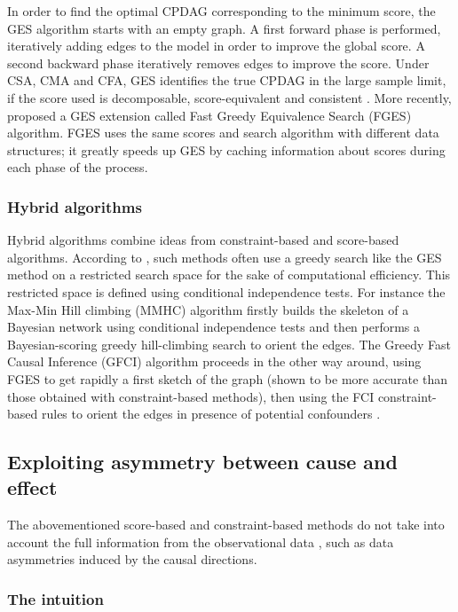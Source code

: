 \documentclass[a4paper, 11pt]{article}
\begin{document}
In order to find the optimal CPDAG corresponding to the minimum score, the GES algorithm starts with an empty graph. A first forward phase is performed, iteratively adding edges to the model in order to improve the global score.  A second backward phase iteratively removes edges to improve the score. Under CSA, CMA and CFA, GES identifies the true CPDAG in the large sample limit, if the score used is decomposable, score-equivalent and consistent \citep{chickering2002optimal}. More recently, \cite{ramsey2015scaling} proposed a GES extension called Fast Greedy Equivalence Search (FGES) algorithm.  FGES uses the same scores and search algorithm with different data structures; it greatly speeds up GES by caching information about scores during each phase of the process.

\subsubsection{Hybrid algorithms} 

Hybrid algorithms combine ideas from constraint-based and score-based algorithms. According to \cite{nandy2015high}, such methods often use a greedy search like the GES method on a restricted search space for the sake of computational efficiency. This  restricted space is defined using conditional independence tests.   For instance the Max-Min Hill climbing (MMHC) algorithm \citep{tsamardinos2006max} firstly builds the skeleton of a Bayesian network using conditional independence tests and then performs a Bayesian-scoring greedy hill-climbing search to orient the edges. 
The Greedy Fast Causal Inference (GFCI) algorithm proceeds in the other way around, using FGES to get rapidly a first sketch of the graph (shown to be more accurate than those obtained with constraint-based methods), then using the FCI constraint-based rules to orient the edges in presence of potential confounders \citep{ogarrio2016hybrid}.

\subsection{Exploiting asymmetry between cause and effect}

The abovementioned score-based and constraint-based methods do not take into account the full information from the observational data \citep{spirtes2016causal}, such as data asymmetries induced by the causal directions.

\subsubsection{The intuition} 
\end{document}
